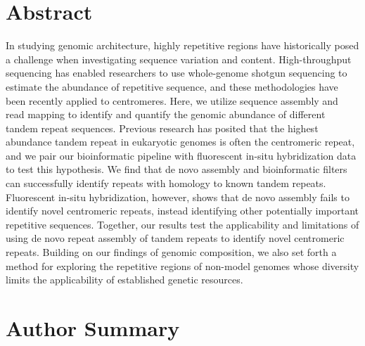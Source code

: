 \documentclass[10pt,letterpaper]{article}
\newcommand{\jri}[1]{\todo[size=\scriptsize, color=SkyBlue]{#1}}
\newcommand{\pb}[1]{\todo[size=\scriptsize, color=Bittersweet]{#1}} %
\begin{document}
\section*{Abstract}
\jri{JRI comments}
\pb{PB comments}
In studying genomic architecture, highly repetitive regions have historically posed a challenge when investigating sequence variation and content.
High-throughput sequencing has enabled researchers to use whole-genome shotgun sequencing to estimate the abundance of repetitive sequence, and these methodologies have been recently applied to centromeres.
Here, we utilize sequence assembly and read mapping to identify and quantify the genomic abundance of different tandem repeat sequences.
Previous research has posited that the highest abundance tandem repeat in eukaryotic genomes is often the centromeric repeat, and we pair our bioinformatic pipeline with fluorescent in-situ hybridization data to test this hypothesis.
We find that de novo assembly and bioinformatic filters can successfully identify repeats with homology to known tandem repeats.
Fluorescent in-situ hybridization, however, shows that de novo assembly fails to identify novel centromeric repeats, instead identifying other potentially important repetitive sequences.
Together, our results test the applicability and limitations of using de novo repeat assembly of tandem repeats to identify novel centromeric repeats.
Building on our findings of genomic composition, we also set forth a method for exploring the repetitive regions of non-model genomes whose diversity limits the applicability of established genetic resources.

\section*{Author Summary}
\end{document}

